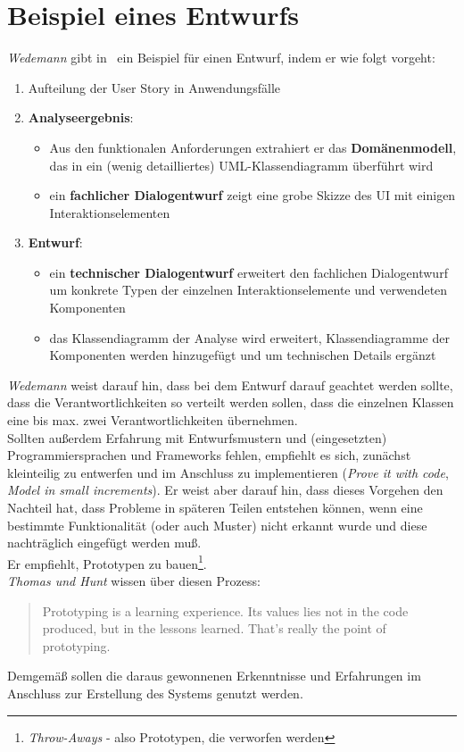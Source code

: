 \section{Beispiel eines Entwurfs}
\textit{Wedemann} gibt in~\cite[63 ff.]{Wed09b} ein Beispiel für einen Entwurf, indem er wie folgt vorgeht:

\begin{enumerate}
    \item Aufteilung der User Story in Anwendungsfälle
    \item \textbf{Analyseergebnis}:
    \begin{itemize}
        \item  Aus den funktionalen Anforderungen extrahiert er das \textbf{Domänenmodell}, das in ein (wenig detailliertes) UML-Klassendiagramm überführt wird
        \item  ein \textbf{fachlicher Dialogentwurf} zeigt eine grobe Skizze des UI mit einigen Interaktionselementen
    \end{itemize}
    \item \textbf{Entwurf}:
    \begin{itemize}
        \item ein \textbf{technischer Dialogentwurf} erweitert den fachlichen Dialogentwurf um konkrete Typen der einzelnen Interaktionselemente und verwendeten Komponenten
        \item das Klassendiagramm der Analyse wird erweitert, Klassendiagramme der Komponenten werden hinzugefügt und um technischen Details ergänzt
    \end{itemize}
\end{enumerate}

\noindent
\textit{Wedemann} weist darauf hin, dass bei dem Entwurf darauf geachtet werden sollte, dass die Verantwortlichkeiten so verteilt werden sollen, dass die einzelnen Klassen eine bis max. zwei Verantwortlichkeiten übernehmen.\\

\noindent
Sollten außerdem Erfahrung mit Entwurfsmustern und (eingesetzten) Programmiersprachen und Frameworks fehlen, empfiehlt es sich, zunächst kleinteilig zu entwerfen und im Anschluss zu implementieren (\textit{Prove it with code}, \textit{Model in small increments}).
Er weist aber darauf hin, dass dieses Vorgehen den Nachteil hat, dass Probleme in späteren Teilen entstehen können, wenn eine bestimmte Funktionalität (oder auch Muster) nicht erkannt wurde und diese nachträglich eingefügt werden muß.\\
Er empfiehlt, Prototypen zu bauen\footnote{
    \textit{Throw-Aways} - also Prototypen, die verworfen werden
}.\\
\textit{Thomas und Hunt} wissen über diesen Prozess:

\blockquote[{\cite[57]{TH19}}]{
Prototyping is a learning experience. Its values lies not in the code produced, but in the lessons learned. That's really the point of prototyping.
}

\noindent
Demgemäß sollen die daraus gewonnenen Erkenntnisse und Erfahrungen im Anschluss zur Erstellung des Systems genutzt werden.
